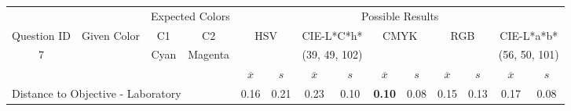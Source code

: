 \begin{table}[H]
  \resizebox{\textwidth}{!} {
  \begin{tabular}{lccccccccccccc}
    \hline
    \multicolumn{1}{c}{}                              &                                      & \multicolumn{2}{c}{Expected Colors}                   & \multicolumn{10}{c}{Possible Results}                                                                                                                                                                                                                                                                                        \\ \cline{3-14}
    \multicolumn{1}{c}{\multirow{-2}{*}{Question ID}} & \multirow{-2}{*}{Given Color}        & C1                       & C2                         & \multicolumn{2}{c}{HSV}                                        & \multicolumn{2}{c}{CIE-L*C*h*}                                 & \multicolumn{2}{c}{CMYK}                                       & \multicolumn{2}{c}{RGB}                                        & \multicolumn{2}{c}{CIE-L*a*b*}                                 \\ \hline
    \multicolumn{1}{c}{7}                             & \cellcolor[HTML]{0000FF}{\color[HTML]{FFFFFF}(18, 7, 95)} & \multicolumn{1}{c|}{Cyan} & \multicolumn{1}{c|}{Magenta}  & \multicolumn{2}{c|}{\cellcolor[HTML]{0000FF}{\color[HTML]{FFFFFF}(18, 7, 95)}}      & \multicolumn{2}{c|}{\cellcolor[HTML]{00CAFF}(39, 49, 102)}       & \multicolumn{2}{c|}{\cellcolor[HTML]{8080FF}{\color[HTML]{FFFFFF}(35, 27, 98)}}       & \multicolumn{2}{c|}{\cellcolor[HTML]{8080FF}{\color[HTML]{FFFFFF}(35, 27, 98)}}       & \multicolumn{2}{c|}{\cellcolor[HTML]{C6AEFF}(56, 50, 101)}       \\ \hline
                                                      & \multicolumn{1}{l}{}                 & \multicolumn{1}{l}{}     & \multicolumn{1}{l}{}       & \multicolumn{1}{c}{$\overline{x}$} & \multicolumn{1}{c}{$s$} & \multicolumn{1}{c}{$\overline{x}$} & \multicolumn{1}{c}{$s$} & \multicolumn{1}{c}{$\overline{x}$} & \multicolumn{1}{c}{$s$} & \multicolumn{1}{c}{$\overline{x}$} & \multicolumn{1}{c}{$s$} & \multicolumn{1}{c}{$\overline{x}$} & \multicolumn{1}{c}{$s$} \\ \hline
    \multicolumn{4}{l}{Distance to Objective - Laboratory}                                                                                           & \multicolumn{1}{|c}{0.16}       & \multicolumn{1}{c|}{0.21}    & \multicolumn{1}{|c}{0.23}       & \multicolumn{1}{c|}{0.10}    & \multicolumn{1}{|c}{\textbf{0.10}}       & \multicolumn{1}{c|}{0.08}    & \multicolumn{1}{|c}{0.15}       & \multicolumn{1}{c|}{0.13}    & \multicolumn{1}{|c}{0.17}       & \multicolumn{1}{c|}{0.08}    \\

\end{tabular}}
\end{table}
